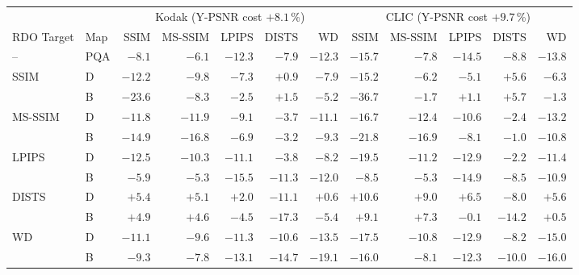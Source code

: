 \begin{tabular}{llrrrrr|rrrrr}
\toprule
 & & \multicolumn{5}{c}{Kodak (Y-PSNR cost $+8.1$\,\%)} & \multicolumn{5}{c}{CLIC (Y-PSNR cost $+9.7$\,\%)} \\
\cmidrule(lr){3-7}\cmidrule(lr){8-12}
RDO Target & Map & SSIM & MS-SSIM & LPIPS & DISTS & WD & SSIM & MS-SSIM & LPIPS & DISTS & WD \\
\midrule
-- & PQA & $-8.1$ & $-6.1$ & $-12.3$ & $-7.9$ & $-12.3$ & $-15.7$ & $-7.8$ & $-14.5$ & $-8.8$ & $-13.8$ \\
\midrule
\rowcolor{metband}SSIM & D & $-12.2$ & $-9.8$ & $-7.3$ & $+0.9$ & $-7.9$ & $-15.2$ & $-6.2$ & $-5.1$ & $+5.6$ & $-6.3$ \\
\rowcolor{metband} & B & $\mathbf{-23.6}$ & $-8.3$ & $-2.5$ & $+1.5$ & $-5.2$ & $\mathbf{-36.7}$ & $-1.7$ & $+1.1$ & $+5.7$ & $-1.3$ \\
MS-SSIM & D & $-11.8$ & $-11.9$ & $-9.1$ & $-3.7$ & $-11.1$ & $-16.7$ & $-12.4$ & $-10.6$ & $-2.4$ & $-13.2$ \\
 & B & $-14.9$ & $\mathbf{-16.8}$ & $-6.9$ & $-3.2$ & $-9.3$ & $-21.8$ & $\mathbf{-16.9}$ & $-8.1$ & $-1.0$ & $-10.8$ \\
\rowcolor{metband}LPIPS & D & $-12.5$ & $-10.3$ & $-11.1$ & $-3.8$ & $-8.2$ & $-19.5$ & $-11.2$ & $-12.9$ & $-2.2$ & $-11.4$ \\
\rowcolor{metband} & B & $-5.9$ & $-5.3$ & $\mathbf{-15.5}$ & $-11.3$ & $-12.0$ & $-8.5$ & $-5.3$ & $\mathbf{-14.9}$ & $-8.5$ & $-10.9$ \\
DISTS & D & $+5.4$ & $+5.1$ & $+2.0$ & $-11.1$ & $+0.6$ & $+10.6$ & $+9.0$ & $+6.5$ & $-8.0$ & $+5.6$ \\
 & B & $+4.9$ & $+4.6$ & $-4.5$ & $\mathbf{-17.3}$ & $-5.4$ & $+9.1$ & $+7.3$ & $-0.1$ & $\mathbf{-14.2}$ & $+0.5$ \\
\rowcolor{metband}WD & D & $-11.1$ & $-9.6$ & $-11.3$ & $-10.6$ & $-13.5$ & $-17.5$ & $-10.8$ & $-12.9$ & $-8.2$ & $-15.0$ \\
\rowcolor{metband} & B & $-9.3$ & $-7.8$ & $-13.1$ & $-14.7$ & $\mathbf{-19.1}$ & $-16.0$ & $-8.1$ & $-12.3$ & $-10.0$ & $\mathbf{-16.0}$ \\
\bottomrule
\end{tabular}
